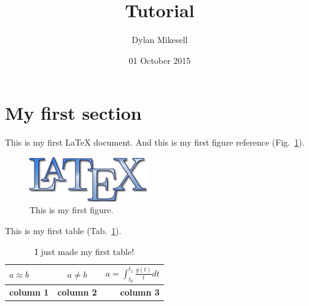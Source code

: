 \documentclass{article}
\author{Dylan Mikesell} %
\title{\latex Tutorial} %
\date{01 October 2015} %
\newcommand{\latex}{\LaTeX\xspace}
\begin{document}
\maketitle %

\newpage

\tableofcontents %

\newpage

\section{My first section} %


This is my first \latex document. And this is my first figure reference (Fig.~\ref{fig:firstFigure}).%

\begin{figure}
	\centering
	\includegraphics[width=0.5\columnwidth]{LaTeXLogo.png}
	\caption{This is my first figure.}
	\label{fig:firstFigure}
\end{figure}

This is my first table (Tab.~\ref{tab:firstTable}).


\begin{table}[b]
	\begin{tabular}{l|c|r}
	$a \approx b$ & $a \ne b$ & $a = \int_{t_0}^{t_1} \frac{g(t)}{t} dt $ \\ \hline
	\textbf{column 1} & \textbf{column 2} & \textbf{column 3} \\ \hline
	\end{tabular}
	\caption{I just made my first table!}
	\label{tab:firstTable}
\end{table}
\end{document}
